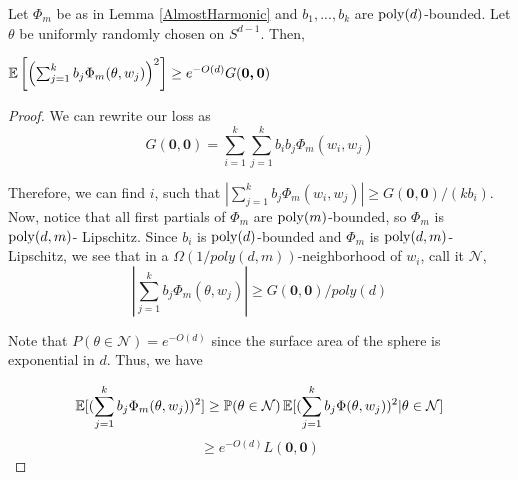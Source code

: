 \begin{lemma}\label{bigVariance}
Let $\Phi_m$ be as in Lemma \ref{AlmostHarmonic} and $b_1,...,b_k$ are $\mathrm{poly}(d)$-bounded. Let $\theta$ be uniformly randomly chosen on $S^{d-1}$. Then,
 
 $\operatorname*{\mathbb{E}}\left[\left(  \sum_{j=1}^k b_j \Phi_m(\theta,w_j)\right)^2\right]
 \geq e^{-O(d)}G(\boldsymbol{0,0})$
\end{lemma}
\begin{proof}

We can rewrite our loss as
%
\[G(\boldsymbol{0,0}) =  \sum_{i=1}^k\sum_{j=1}^k b_i b_j \Phi_m(w_i, w_j) \]

Therefore, we can find $i$, such that
$|\sum_{j=1}^k b_j \Phi_m(w_i, w_j)| \geq
G(\boldsymbol{0,0})/(kb_i)$. Now, notice that all first partials of $\Phi_m$ are $\mathrm{poly}(m)$-bounded, so $\Phi_m$ is $\mathrm{poly}(d, m)$- Lipschitz. Since $b_i$ is $\mathrm{poly}(d)$-bounded and $\Phi_m$ is $\mathrm{poly}(d,m)$-Lipschitz, we see
that in a $\Omega(1/poly(d,m))$-neighborhood of $w_i$, call it $\mathcal{N}$,
%
\[|\sum_{j=1}^k b_j \Phi_m(\theta, w_j)| \geq G(\boldsymbol{0,0})/poly(d) \]

Note that $P(\theta \in \mathcal{N}) = e^{-O(d)}$ since the surface area of the sphere is exponential in $d$. Thus, we have

\[\operatorname*{\mathbb{E}}[(  \sum_{j=1}^k b_j \Phi_m(\theta,w_j))^2]
 \geq \operatorname*{\mathbb{P}}(\theta \in \mathcal{N})\operatorname*{\mathbb{E}}[(\sum_{j=1}^k b_j \Phi(\theta, w_j))^2 | \theta \in \mathcal{N}]\]
\[\geq e^{-O(d)} L(\boldsymbol{0,0})\]
\end{proof}




